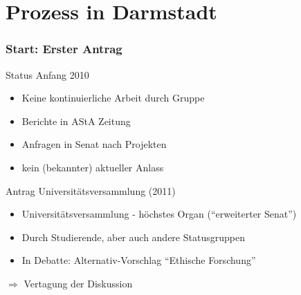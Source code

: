 \documentclass[presentation]{beamer}
\begin{document}
\section{Prozess in Darmstadt}
\label{sec-2}
\begin{frame}
\frametitle{Start: Erster Antrag}
\label{sec-2-1}
\begin{block}{Status Anfang 2010}
\label{sec-2-1-1}

\begin{itemize}
\item Keine kontinuierliche Arbeit durch Gruppe
\item Berichte in AStA Zeitung
\item Anfragen in Senat nach Projekten
\item kein (bekannter) aktueller Anlass
\end{itemize}
\pause
\end{block}
\begin{block}{Antrag Universitätsversammlung (2011)}
\label{sec-2-1-2}

\begin{itemize}
\item Universitätsversammlung - höchstes Organ (``erweiterter Senat'')
\item Durch Studierende, aber auch andere Statusgruppen
\item In Debatte: Alternativ-Vorschlag ``Ethische Forschung''
\end{itemize}
    
    \( \Rightarrow \) Vertagung der Diskussion 
\end{block}
\end{frame}
\end{document}
